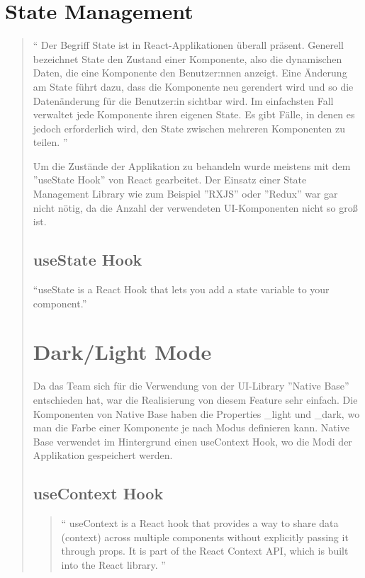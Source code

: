 \section{State Management}
\begin{quotation}
  ``
  Der Begriff State ist in React-Applikationen überall präsent. Generell
  bezeichnet State den Zustand einer Komponente,
  also die dynamischen Daten, die eine Komponente den Benutzer:nnen anzeigt.
  Eine Änderung am State führt dazu, dass die Komponente neu gerendert wird
  und so die Datenänderung für die Benutzer:in sichtbar wird.
  Im einfachsten Fall verwaltet jede Komponente ihren eigenen State.
  Es gibt Fälle, in denen es jedoch erforderlich wird,
  den State zwischen mehreren Komponenten zu teilen.
  ''
  \cite{state-management}

  Um die Zustände der Applikation zu behandeln wurde meistens mit dem ''useState Hook'' von React gearbeitet.
  Der Einsatz einer State Management Library wie zum Beispiel ''RXJS'' oder ''Redux'' war gar nicht nötig, da die Anzahl der verwendeten UI-Komponenten nicht so groß ist.

  \subsection{useState Hook}
  ``useState is a React Hook that lets you add a state variable to your component.'' \cite{useState}


  \section{Dark/Light Mode}
  Da das Team sich für die Verwendung von der UI-Library ''Native Base'' entschieden hat, war die Realisierung von diesem Feature sehr einfach.
  Die Komponenten von Native Base haben die Properties \_light und \_dark, wo man die Farbe einer Komponente je nach Modus definieren kann.
  Native Base verwendet im Hintergrund einen useContext Hook, wo die Modi der Applikation gespeichert werden.
  \subsection{useContext Hook}
  \begin{quotation}
    ``
    useContext is a React hook that provides a way to share data (context)
    across multiple components without explicitly passing it through props.
    It is part of the React Context API, which is built into the React library.
    '' \cite{useContext}

  \end{quotation}




\end{quotation}

